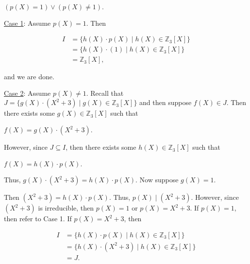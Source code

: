 \documentclass[12pt, a4paper]{article}
\begin{document}
\vspace{4mm}

\centerline{$(p(X)=1)\vee (p(X)\neq 1)$.}

\vspace{8mm}\par

\underline{Case 1}: Assume $p(X)=1$. Then

\begin{equation*}
        \begin{split}
            I &= \{h(X)\cdot p(X)\mid h(X)\in\mathbb{Z}_3[X]\} \\
            &= \{h(X)\cdot(1)\mid h(X)\in\mathbb{Z}_3[X]\} \\
            &=\mathbb{Z}_3[X],
        \end{split}
    \end{equation*}
    
\vspace{4mm}

\par and we are done.

\vspace{8mm}\par

\underline{Case 2}: Assume $p(X)\neq 1$. Recall that $J=\{g(X)\cdot(X^2+3)\mid g(X)\in\mathbb{Z}_3[X]\}$ and then suppose $f(X)\in J$. Then there exists some $g(X)\in\mathbb{Z}_3[X]$ such that

\vspace{4mm}

\centerline{$f(X)=g(X)\cdot(X^2+3)$.}

\vspace{4mm}

\noindent However, since $J\subseteq I$, then there exists some $h(X)\in\mathbb{Z}_3[X]$ such that 

\vspace{4mm}

\centerline{$f(X)=h(X)\cdot p(X)$.}

\vspace{4mm}

\noindent Thus, $g(X)\cdot(X^2+3)=h(X)\cdot p(X)$. Now suppose $g(X)=1$. 

\newpage

\noindent Then $(X^2+3)=h(X)\cdot p(X)$. Thus, $p(X)\mid(X^2+3)$. However, since $(X^2+3)$ is irreducible, then $p(X)=1$ or $p(X)=X^2+3$. If $p(X)=1$, then refer to Case 1. If $p(X)=X^2+3$, then 

\vspace{4mm}

\begin{equation*}
        \begin{split}
            I &= \{h(X)\cdot p(X)\mid h(X)\in\mathbb{Z}_3[X]\} \\
            &= \{h(X)\cdot(X^2+3)\mid h(X)\in\mathbb{Z}_3[X]\} \\
            &= J.
        \end{split}
    \end{equation*}
    
\vspace{4mm}
\end{document}
